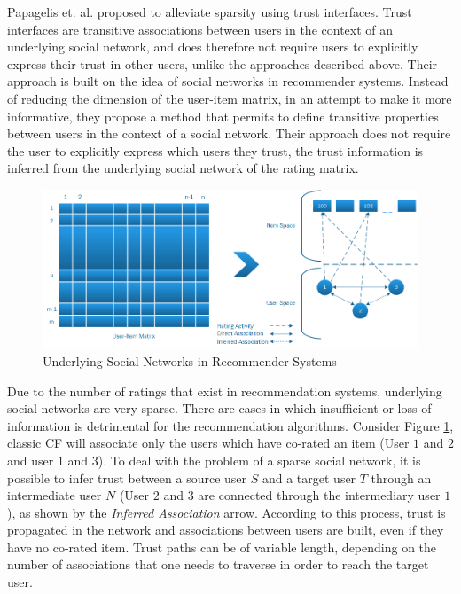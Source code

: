 Papagelis et. al. \cite{Papagelis2005} proposed to alleviate sparsity using
trust interfaces. Trust interfaces are transitive associations between users in
the context of an underlying social network, and does therefore not require users to explicitly express their trust in other users, unlike the approaches described above. Their approach is built on the
idea of social networks in recommender systems. Instead of reducing the
dimension of the user-item matrix, in an attempt to make it more informative,
they propose a method that permits to define transitive properties between
users in the context of a social network. Their approach does not require the
user to explicitly express which users they trust, the trust information is
inferred from the underlying social network of the rating matrix.

\begin{figure}[H]
    \includegraphics[width=5in]{image/trustnetwork.png}
    \centering
    \caption[Underlying Social Networks in Recommender Systems]{Underlying Social Networks in Recommender Systems}
    \label{figure:cfsocialnetwork}
\end{figure}

Due to the number of ratings that exist in recommendation systems, underlying
social networks are very sparse. There are cases in which insufficient or loss
of information is detrimental for the recommendation algorithms. Consider
Figure \ref{figure:cfsocialnetwork}, classic CF will associate only the users
which have co-rated an item (User $1$ and $2$ and user $1$ and $3$). To deal
with the problem of a sparse social network, it is possible to infer trust
between a source user $S$ and a target user $T$ through an intermediate user
$N$ (User $2$ and $3$ are connected through the intermediary user $1$), as
shown by the \emph{Inferred Association} arrow. According to this process,
trust is propagated in the network and associations between users are built,
even if they have no co-rated item. Trust paths can be of variable length,
depending on the number of associations that one needs to traverse in order to
reach the target user.


